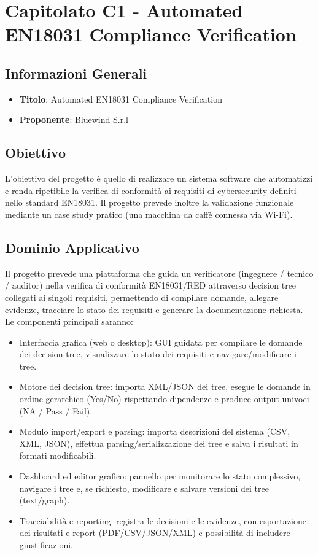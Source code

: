 \documentclass[a4paper,12pt]{article}
\begin{document}
    \section{Capitolato C1 - Automated EN18031 Compliance Verification}
    \subsection{Informazioni Generali}
        \begin{itemize}
            \item \textbf{Titolo}: Automated EN18031 Compliance Verification
            \item \textbf{Proponente}: Bluewind S.r.l
        \end{itemize}
    \subsection{Obiettivo}
    L’obiettivo del progetto è quello di realizzare un sistema software che automatizzi e renda ripetibile la verifica di conformità ai requisiti di cybersecurity definiti nello standard EN18031. Il progetto prevede inoltre la validazione funzionale mediante un case study pratico (una macchina da caffè connessa via Wi-Fi).
    \subsection{Dominio Applicativo}
    Il progetto prevede una piattaforma che guida un verificatore (ingegnere / tecnico / auditor) nella verifica di conformità EN18031/RED attraverso decision tree collegati ai singoli requisiti, permettendo di compilare domande, allegare evidenze, tracciare lo stato dei requisiti e generare la documentazione richiesta.\\
    Le componenti principali saranno:
    \begin{itemize}
        \item Interfaccia grafica (web o desktop): GUI guidata per compilare le domande dei decision tree, visualizzare lo stato dei requisiti e navigare/modificare i tree.
        \item Motore dei decision tree: importa XML/JSON dei tree, esegue le domande in ordine gerarchico (Yes/No) rispettando dipendenze e produce output univoci (NA / Pass / Fail).
        \item Modulo import/export e parsing: importa descrizioni del sistema (CSV, XML, JSON), effettua parsing/serializzazione dei tree e salva i risultati in formati modificabili.
        \item Dashboard ed editor grafico: pannello per monitorare lo stato complessivo, navigare i tree e, se richiesto, modificare e salvare versioni dei tree (text/graph).
        \item Tracciabilità e reporting: registra le decisioni e le evidenze, con esportazione dei risultati e report (PDF/CSV/JSON/XML) e possibilità di includere giustificazioni.
    \end{itemize}
\end{document}

